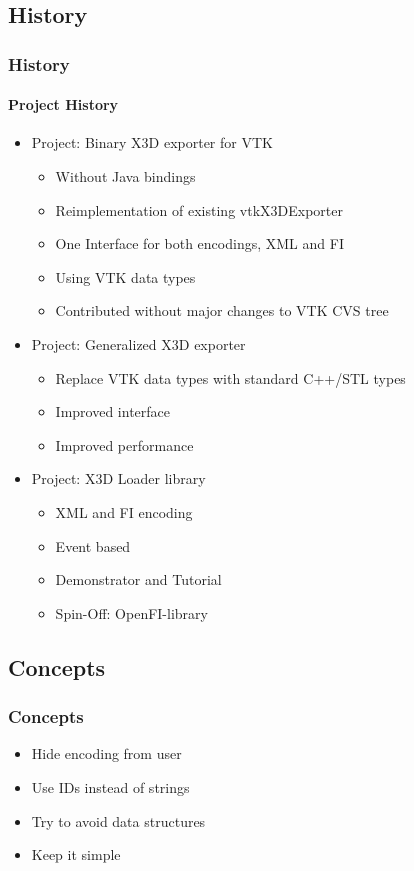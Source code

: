 \documentclass[t]{beamer}
\begin{document}
  \subsection{History} 
\begin{frame}
\frametitle{History}
\framesubtitle{Project History}

\begin{itemize}
	\item Project: Binary X3D exporter for VTK
	\onslide*<2> { 
	  \begin{itemize}
		\item Without Java bindings
		\item Reimplementation of existing vtkX3DExporter
		\item One Interface for both encodings, XML and FI
		\item Using VTK data types
		\item Contributed without major changes to VTK CVS tree
		\end{itemize}
	 }
  \item Project: Generalized X3D exporter
	\onslide*<3> { 
  \begin{itemize}
	\item Replace VTK data types with standard C++/STL types
	\item Improved interface
	\item Improved performance
	\end{itemize}
	}
  \item Project: X3D Loader library
	\onslide*<4> { 
  \begin{itemize}
	\item XML and FI encoding
	\item Event based
	\item Demonstrator and Tutorial
	\item Spin-Off: OpenFI-library
	\end{itemize}
	}
  \end{itemize}
\end{frame}
  
\subsection{Concepts} 
\begin{frame}
\frametitle{Concepts}
\begin{itemize}
	\item Hide encoding from user
	\item Use IDs instead of strings
	\item Try to avoid data structures
	\item Keep it simple
\end{itemize}
\end{frame}
\end{document}
